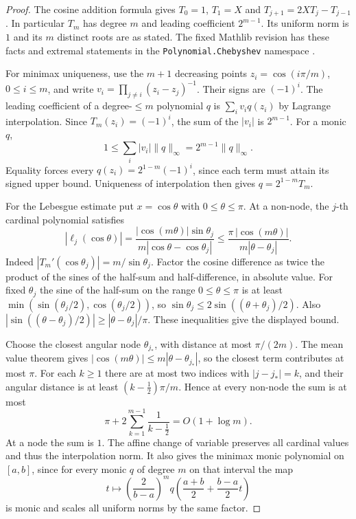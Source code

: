 \documentclass[11pt,oneside,openany]{book}
\theoremstyle{plain}
\theoremstyle{definition}
\theoremstyle{remark}
\begin{document}
\begin{proof}
The cosine addition formula gives \(T_0=1\), \(T_1=X\) and
\(T_{j+1}=2XT_j-T_{j-1}\). In particular \(T_m\) has
degree \(m\) and leading coefficient \(2^{m-1}\). Its uniform
norm is \(1\) and its \(m\) distinct roots are as stated.
The fixed Mathlib revision has these facts and extremal statements
in the \texttt{Polynomial.Chebyshev} namespace \cite{mathlib}.

For minimax uniqueness, use the \(m+1\) decreasing points
\(z_i=\cos(i\pi/m)\), \(0\le i\le m\), and write
\(v_i=\prod_{j\ne i}(z_i-z_j)^{-1}\). Their signs are \((-1)^i\).
The leading coefficient of a degree-\(\le m\) polynomial \(q\)
is \(\sum_i v_i q(z_i)\) by Lagrange interpolation.
Since \(T_m(z_i)=(-1)^i\), the sum of the \(|v_i|\) is
\(2^{m-1}\). For a monic \(q\),
\[
  1\le \sum_i |v_i|\lVert q\rVert_\infty
    =2^{m-1}\lVert q\rVert_\infty .
\]
Equality forces every \(q(z_i)=2^{1-m}(-1)^i\), since each
term must attain its signed upper bound. Uniqueness of interpolation
then gives \(q=2^{1-m}T_m\).

For the Lebesgue estimate put \(x=\cos\theta\) with
\(0\le\theta\le\pi\). At a non-node, the \(j\)-th cardinal
polynomial satisfies
\[
 |\ell_j(\cos\theta)|
  =\frac{|\cos(m\theta)|\sin\theta_j}
         {m|\cos\theta-\cos\theta_j|}
  \le \frac{\pi\,|\cos(m\theta)|}{m|\theta-\theta_j|}.
\]
Indeed \(|T_m'(\cos\theta_j)|=m/\sin\theta_j\).
Factor the cosine difference as twice the product of the
sines of the half-sum and half-difference, in absolute value.
For fixed \(\theta_j\) the sine of the half-sum on the range
\(0\le\theta\le\pi\) is at least
\(\min(\sin(\theta_j/2),\cos(\theta_j/2))\),
so \(\sin\theta_j\le2\sin((\theta+\theta_j)/2)\).
Also \(|\sin((\theta-\theta_j)/2)|\ge|\theta-\theta_j|/\pi\).
These inequalities give the displayed bound.

Choose the closest angular node \(\theta_{j_*}\), with distance
at most \(\pi/(2m)\). The mean value theorem gives
\(|\cos(m\theta)|\le m|\theta-\theta_{j_*}|\), so the closest
term contributes at most \(\pi\). For each \(k\ge1\) there
are at most two indices with \(|j-j_*|=k\), and their angular
distance is at least \((k-\tfrac12)\pi/m\). Hence at every non-node
the sum is at most
\[
 \pi+2\sum_{k=1}^{m-1}\frac{1}{k-\tfrac12}
      =O(1+\log m).
\]
At a node the sum is \(1\). The affine change of variable
preserves all cardinal values and thus the interpolation norm.
It also gives the minimax monic polynomial on \([a,b]\), since
for every monic \(q\) of degree \(m\) on that interval the map
\[
 t\longmapsto
 \left(\frac{2}{b-a}\right)^m q\!\left(\frac{a+b}{2}
                              +\frac{b-a}{2}t\right)
\]
is monic and scales all uniform norms by the same factor.


\end{proof}
\end{document}
